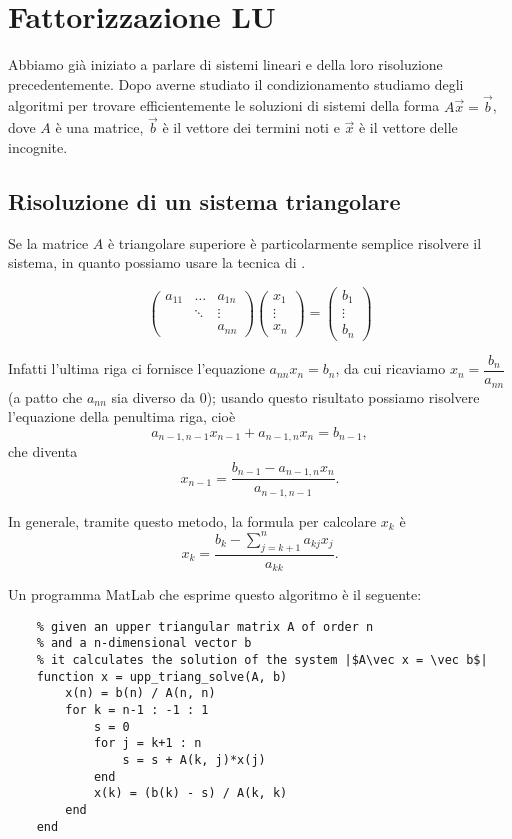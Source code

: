 \section{Fattorizzazione LU}

Abbiamo già iniziato a parlare di sistemi lineari e della loro risoluzione precedentemente. Dopo averne studiato il condizionamento studiamo degli algoritmi per trovare efficientemente le soluzioni di sistemi della forma $A\vec x = \vec b$, dove $A$ è una matrice, $\vec b$ è il vettore dei termini noti e $\vec x$ è il vettore delle incognite.

\subsection{Risoluzione di un sistema triangolare}

Se la matrice $A$ è triangolare superiore è particolarmente semplice risolvere il sistema, in quanto possiamo usare la tecnica di .

\[
    \begin{pmatrix}
        a_{11}  &\dots  &a_{1n} \\
                &\ddots &\vdots \\
                &       &a_{nn}
    \end{pmatrix} \begin{pmatrix}
        x_1 \\ \vdots \\ x_n
    \end{pmatrix} = \begin{pmatrix}
        b_1 \\ \vdots \\ b_n
    \end{pmatrix}
\]

Infatti l'ultima riga ci fornisce l'equazione $a_{nn}x_n = b_n$, da cui ricaviamo $x_n = \dfrac{b_n}{a_{nn}}$ (a patto che $a_{nn}$ sia diverso da $0$); usando questo risultato possiamo risolvere l'equazione della penultima riga, cioè \[
    a_{n-1, n-1}x_{n-1}+a_{n-1,n}x_n = b_{n-1},
\] che diventa \[
    x_{n-1} = \frac{b_{n-1} - a_{n-1,n}x_n}{a_{n-1,n-1}}.
\]

In generale, tramite questo metodo, la formula per calcolare $x_k$ è \[
    x_k = \frac{\displaystyle b_k - \sum_{j=k+1}^n a_{kj}x_j}{a_{kk}}.
\]

Un programma MatLab che esprime questo algoritmo è il seguente:
\begin{verbatim}
    % given an upper triangular matrix A of order n
    % and a n-dimensional vector b
    % it calculates the solution of the system |$A\vec x = \vec b$|
    function x = upp_triang_solve(A, b)
        x(n) = b(n) / A(n, n)
        for k = n-1 : -1 : 1
            s = 0
            for j = k+1 : n
                s = s + A(k, j)*x(j)
            end
            x(k) = (b(k) - s) / A(k, k)
        end
    end
\end{verbatim}

